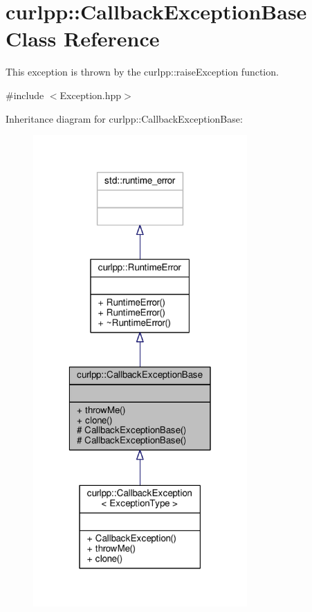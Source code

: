 \hypertarget{classcurlpp_1_1CallbackExceptionBase}{\section{curlpp\-:\-:Callback\-Exception\-Base Class Reference}
\label{classcurlpp_1_1CallbackExceptionBase}
}


This exception is thrown by the curlpp\-::raise\-Exception function.  




{\ttfamily \#include $<$Exception.\-hpp$>$}



Inheritance diagram for curlpp\-:\-:Callback\-Exception\-Base\-:\nopagebreak
\begin{figure}[H]
\begin{center}
\leavevmode
\includegraphics[width=232pt]{classcurlpp_1_1CallbackExceptionBase__inherit__graph}
\end{center}
\end{figure}


